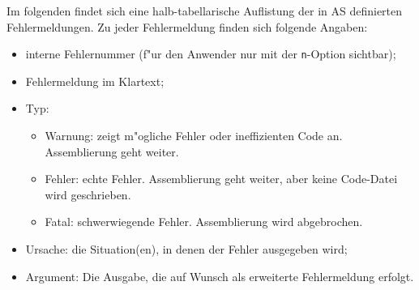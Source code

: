 \documentclass[12pt,a4paper,twoside]{report}
\newcommand{\tty}[1]{{\tt #1}}
\begin{document}
Im folgenden findet sich eine halb-tabellarische Auflistung der in AS
definierten Fehlermeldungen.  Zu jeder Fehlermeldung finden sich folgende
Angaben:
\begin{itemize}
\item{interne Fehlernummer (f"ur den Anwender nur mit der \tty{n}-Option sichtbar);}
\item{Fehlermeldung im Klartext;}
\item{Typ:
      \begin{itemize}
      \item{Warnung: zeigt m"ogliche Fehler oder ineffizienten Code an.
            Assemblierung geht weiter.}
      \item{Fehler: echte Fehler.  Assemblierung geht weiter, aber keine
            Code-Datei wird geschrieben.}
      \item{Fatal: schwerwiegende Fehler.  Assemblierung wird abgebrochen.}
      \end{itemize}}
\item{Ursache: die Situation(en), in denen der Fehler ausgegeben
      wird;}
\item{Argument: Die Ausgabe, die auf Wunsch als erweiterte Fehlermeldung
      erfolgt.}
\end{itemize}

\par

\newcommand{\errentry}[5]
           {\item[#1]{#2
                      \begin{description}
                      \item[Type:]{\ \\#3}
                      \item[Reason:]{\ \\#4}
                      \item[Argument:]{\ \\#5}
                      \end{description}}
           }
\end{document}
